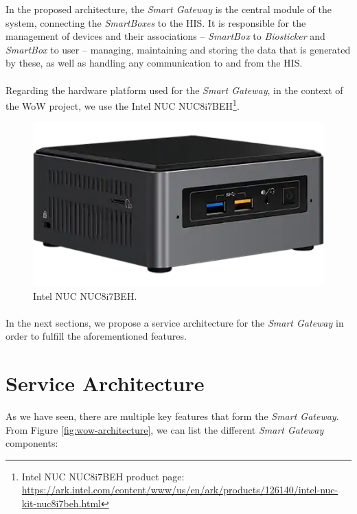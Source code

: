 

In the proposed architecture, the \textit{Smart Gateway} is the central module of the system, connecting the \textit{SmartBoxes} to the \acs{HIS}. It is responsible for the management of devices and their associations -- \textit{SmartBox} to \textit{Biosticker} and \textit{SmartBox} to user -- managing, maintaining and storing the data that is generated by these, as well as handling any communication to and from the \acs{HIS}. 


\paragraph{} Regarding the hardware platform used for the \textit{Smart Gateway}, in the context of the \acs{WoW} project, we use the Intel NUC NUC8i7BEH\footnote{Intel NUC NUC8i7BEH product page: \url{https://ark.intel.com/content/www/us/en/ark/products/126140/intel-nuc-kit-nuc8i7beh.html}}.

\begin{figure}[H]
    \centering
    \includegraphics[width=0.4\linewidth]{images/gateway-image.png}
    \caption[Intel NUC NUC8i7BEH.]{Intel NUC NUC8i7BEH.}
    \label{fig:gateway_image}
\end{figure}


\paragraph{} In the next sections, we propose a service architecture for the \textit{Smart Gateway} in order to fulfill the aforementioned features.



\section{Service Architecture}

As we have seen, there are multiple key features that form the \textit{Smart Gateway}. From Figure \ref{fig:wow-architecture}, we can list the different \textit{Smart Gateway} components:  

